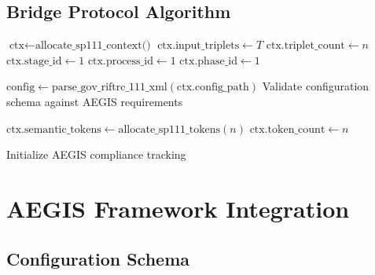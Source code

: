 \documentclass[11pt,a4paper]{article}
\theoremstyle{definition}
\theoremstyle{remark}
\begin{document}
\subsection{Bridge Protocol Algorithm}
\label{subsec:bridge-algorithm}

\begin{algorithm}[H]
\caption{RIFT-000 → RIFT-SP111 Bridge Protocol}
\label{alg:bridge-protocol}
\BlankLine

$\text{ctx} \leftarrow \text{allocate\_sp111\_context()}$\;
$\text{ctx}.\text{input\_triplets} \leftarrow T$\;
$\text{ctx}.\text{triplet\_count} \leftarrow n$\;
$\text{ctx}.\text{stage\_id} \leftarrow 1$\;
$\text{ctx}.\text{process\_id} \leftarrow 1$\;
$\text{ctx}.\text{phase\_id} \leftarrow 1$\;
\BlankLine

$\text{config} \leftarrow \text{parse\_gov\_riftrc\_111\_xml}(\text{ctx}.\text{config\_path})$\;
Validate configuration schema against AEGIS requirements\;
\BlankLine

$\text{ctx}.\text{semantic\_tokens} \leftarrow \text{allocate\_sp111\_tokens}(n)$\;
$\text{ctx}.\text{token\_count} \leftarrow n$\;
\BlankLine

Initialize AEGIS compliance tracking\;
\BlankLine

\;
\end{algorithm}


\section{AEGIS Framework Integration}
\label{sec:aegis-integration}

\subsection{Configuration Schema}
\label{subsec:config-schema}
\end{document}
